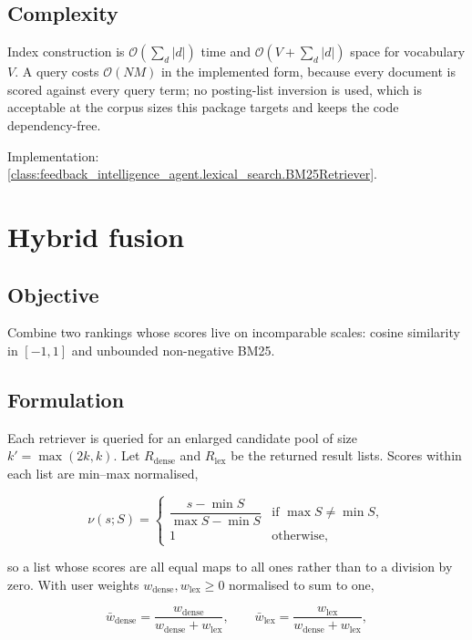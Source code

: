 \subsection*{Complexity}

Index construction is $\mathcal{O}\!\left(\sum_d |d|\right)$ time and
$\mathcal{O}(V + \sum_d |d|)$ space for vocabulary $V$. A query costs
$\mathcal{O}(NM)$ in the implemented form, because every document is scored
against every query term; no posting-list inversion is used, which is
acceptable at the corpus sizes this package targets and keeps the code
dependency-free.

\medskip\noindent
Implementation: \cref{class:feedback_intelligence_agent.lexical_search.BM25Retriever}.

\section{Hybrid fusion}
\label{sec:math-hybrid}

\subsection*{Objective}

Combine two rankings whose scores live on incomparable scales: cosine
similarity in $[-1,1]$ and unbounded non-negative BM25.

\subsection*{Formulation}

Each retriever is queried for an enlarged candidate pool of size
$k' = \max(2k, k)$. Let $R_{\text{dense}}$ and $R_{\text{lex}}$ be the returned
result lists. Scores within each list are min--max normalised,

\begin{equation}
\nu(s; S) =
\begin{cases}
  \dfrac{s - \min S}{\max S - \min S} & \text{if } \max S \neq \min S,\\[8pt]
  1 & \text{otherwise,}
\end{cases}
\end{equation}

so a list whose scores are all equal maps to all ones rather than to a division
by zero. With user weights $w_{\text{dense}}, w_{\text{lex}} \geq 0$ normalised
to sum to one,

\begin{equation}
\bar{w}_{\text{dense}} = \frac{w_{\text{dense}}}{w_{\text{dense}} + w_{\text{lex}}},
\qquad
\bar{w}_{\text{lex}} = \frac{w_{\text{lex}}}{w_{\text{dense}} + w_{\text{lex}}},
\end{equation}

